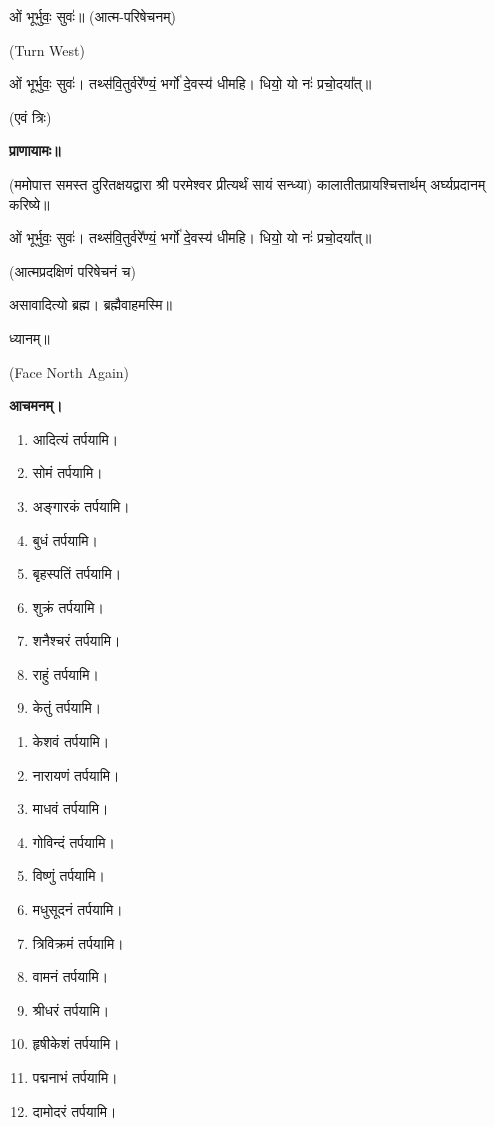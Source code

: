 ओं भूर्भुवः॒ सुवः॑॥ (आत्म-परिषेचनम्)


{\scriptsize (Turn West)}

ओं भूर्भुवः॒ सुवः॑। तथ्स॑वि॒तुर्वरे᳚ण्यं॒ भर्गो॑ दे॒वस्य॑ धीमहि। धियो॒ यो नः॑ प्रचो॒दया᳚त्॥

\hfill{(एवं त्रिः)}


\textbf{प्राणायामः॥}

(ममोपात्त समस्त दुरितक्षयद्वारा श्री परमेश्वर प्रीत्यर्थं सायं सन्ध्या)
कालातीतप्रायश्चित्तार्थम् अर्घ्यप्रदानम् करिष्ये॥

ओं भूर्भुवः॒ सुवः॑। तथ्स॑वि॒तुर्वरे᳚ण्यं॒ भर्गो॑ दे॒वस्य॑ धीमहि। धियो॒ यो नः॑ प्रचो॒दया᳚त्॥

(आत्मप्रदक्षिणं परिषेचनं च)


असावादित्यो ब्रह्म। ब्रह्मैवाहमस्मि॥

ध्यानम्॥

{\scriptsize (Face North Again)}

\textbf{आचमनम्।}



\begin{enumerate}
 \item आदित्यं तर्पयामि।
 \item सोमं तर्पयामि।
 \item अङ्गारकं तर्पयामि।
 \item बुधं तर्पयामि।
 \item बृहस्पतिं तर्पयामि।
 \item शुक्रं तर्पयामि।
 \item शनैश्चरं तर्पयामि।
 \item राहुं तर्पयामि।
 \item केतुं तर्पयामि।
\end{enumerate}


\begin{enumerate}
\item केशवं तर्पयामि।
\item नारायणं तर्पयामि।
\item माधवं तर्पयामि।
\item गोविन्दं तर्पयामि।
\item विष्णुं तर्पयामि।
\item मधुसूदनं तर्पयामि।
\item त्रिविक्रमं तर्पयामि।
\item वामनं तर्पयामि।
\item श्रीधरं तर्पयामि।
\item हृषीकेशं तर्पयामि।
\item पद्मनाभं तर्पयामि।
\item दामोदरं तर्पयामि।
\end{enumerate}

